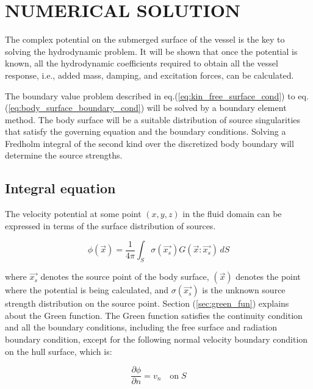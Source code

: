 \chapter{NUMERICAL SOLUTION}
The complex potential on the submerged surface of the vessel is the key to solving the hydrodynamic problem. 
It will be shown that once the potential is known, all the hydrodynamic coefficients required 
to obtain all the vessel response, i.e., added mass, damping, and excitation forces, 
can be calculated.


The boundary value problem described in eq.(\ref{eq:kin_free_surface_cond}) to 
eq.(\ref{eq:body_surface_boundary_cond})  will be solved by a boundary element method. 
The body surface will be a suitable distribution of source singularities that satisfy 
the governing equation and the boundary conditions. Solving a Fredholm integral of the 
second kind over the discretized body boundary will determine the source strengths. 

\section{Integral equation}
The velocity potential at some point $(x, y, z)$ in the fluid domain can be expressed in 
terms of the surface distribution of sources.

\begin{equation}
    \label{eq:vel_pot}
    \phi(\vec{x}) = \frac{1}{4\pi}\int_S \sigma(\vec{x_s})G(\vec{x}:\vec{x_s})\,dS
\end{equation}

where $\vec{x_s}$ denotes the source point of the body surface, $(\vec{x})$ denotes the 
point where the potential is being calculated, and $\sigma(\vec{x_s})$ is the unknown 
source strength distribution on the source point. Section (\ref{sec:green_fun})
explains about the Green function. 
The Green function satisfies the continuity condition and all the boundary conditions, 
including the free surface and radiation boundary condition, except for the following 
normal velocity boundary condition on the hull surface, which is:

\begin{equation}
    \label{eq:vel_boundary_cond}
    \frac{\partial \phi}{\partial n} = v_n \quad \text{on}\; S
\end{equation}

